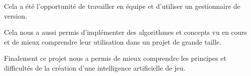 		Cela a été l'opportunité de travailler en équipe et d'utiliser un
		gestionnaire de version.

		Cela nous a aussi permis d'implémenter des algorithmes et concepts
		vu en cours et de mieux comprendre leur utilisation dans un projet
		de grande taille.

		\vspace{1em}
		Finalement ce projet nous a permis de mieux comprendre les principes et
		difficultés de la création d'une intelligence artificielle de jeu.
